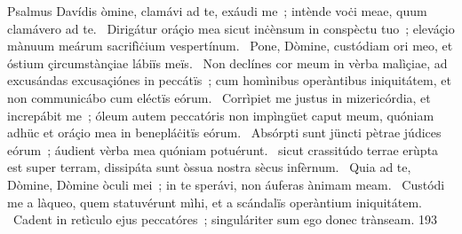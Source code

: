 { Psalmus Davídis}
{%
òmine, clamávi ad te, exáudi me~; intènde voċi meae, quum clamávero ad te. 
~Dirigátur oráçio mea sicut inċènsum in conspèctu tuo~; eleváçio mànuum meárum sacrifìċium vespertínum. 
~Pone, Dòmine, custódiam ori meo, et óstium çircumstànçiae lábiïs meïs. 
~Non declínes cor meum in vèrba malìçiae, ad excusándas excusaçiónes in peccátïs~; cum homìnibus operàntibus iniquitátem, et non communicábo cum eléctïs eórum. 
~Corrìpiet me justus in mizericórdia, et increpábit me~; óleum autem peccatóris non impìngüet caput meum, quóniam adhüc et oráçio mea in benepláċitïs eórum. 
~Absórpti sunt jüncti pètrae júdices eórum~; áudient vèrba mea quóniam potuérunt. 
~sicut crassitúdo terrae erùpta est super terram, dissipáta sunt òssua nostra sècus infèrnum. 
~Quia ad te, Dòmine, Dòmine òculi mei~; in te sperávi, non áuferas ànimam meam. 
~Custódi me a làqueo, quem statuvérunt mìhi, et a scándalïs operàntium iniquitátem. 
~Cadent in retìculo ejus peccatóres~; singuláriter sum ego donec trànseam. 
}
{19}{3}
